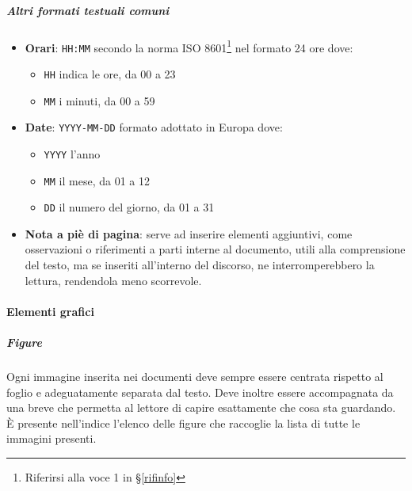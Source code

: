 			\subparagraph{Altri formati testuali comuni} \label{PS:Documentazione:Design:NormeT:AltriFormati}
			\begin{itemize}
				\item \textbf{Orari}: \texttt{HH:MM} secondo la norma ISO 8601\footnote{Riferirsi alla voce
				1
				in \S\ref{rifinfo}}
				nel formato 24 ore dove:
				\begin{itemize}
					\item \texttt{HH} indica le ore, da 00 a 23
					\item \texttt{MM} i minuti, da 00 a 59
				\end{itemize}
				\item \textbf{Date}: \texttt{YYYY-MM-DD} formato adottato in Europa dove:
				\begin{itemize}
					\item \texttt{YYYY} l'anno
					\item \texttt{MM} il mese, da 01 a 12
					\item \texttt{DD} il numero del giorno, da 01 a 31
				\end{itemize}
				\item \textbf{Nota a piè di pagina}: serve ad inserire elementi aggiuntivi, come osservazioni o riferimenti a parti interne al documento, utili alla comprensione del testo,
				ma se inseriti all'interno del discorso, ne interromperebbero la lettura, rendendola meno scorrevole.
			\end{itemize}


			\paragraph{Elementi grafici}

			\subparagraph{Figure}
			Ogni immagine inserita nei documenti deve sempre essere centrata rispetto al foglio e adeguatamente separata dal testo. Deve inoltre essere
			accompagnata da una breve  che permetta al lettore di capire esattamente che cosa sta guardando.\\
			È presente nell'indice l'elenco delle figure che raccoglie la lista di tutte le immagini presenti.

